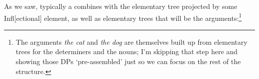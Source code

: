 \documentclass{article}
\begin{document}
As we saw, typically a  combines with the elementary tree projected by some Infl[ectional] element, as well as elementary trees that will be the arguments:\footnote{The arguments \emph{the cat} and \emph{the dog} are themselves built up from elementary trees for the determiners and the nouns; I'm skipping that step here and showing those DPs `pre-assembled' just so we can focus on the rest of the structure.}
\begin{exe}
\end{exe}
\end{document}

